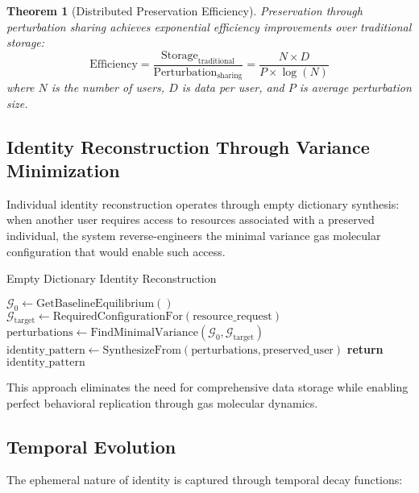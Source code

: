 \documentclass[12pt,a4paper]{article}
\newtheorem{theorem}{Theorem}
\begin{document}
\begin{theorem}[Distributed Preservation Efficiency]
Preservation through perturbation sharing achieves exponential efficiency improvements over traditional storage:
\begin{equation}
\text{Efficiency} = \frac{\text{Storage}_{\text{traditional}}}{\text{Perturbation}_{\text{sharing}}} = \frac{N \times D}{P \times \log(N)}
\end{equation}
where $N$ is the number of users, $D$ is data per user, and $P$ is average perturbation size.
\end{theorem}

\subsection{Identity Reconstruction Through Variance Minimization}

Individual identity reconstruction operates through empty dictionary synthesis: when another user requires access to resources associated with a preserved individual, the system reverse-engineers the minimal variance gas molecular configuration that would enable such access.

\begin{algorithm}
\caption{Empty Dictionary Identity Reconstruction}
\begin{algorithmic}[1]
    \State $\mathcal{G}_0 \leftarrow \text{GetBaselineEquilibrium}()$
    \State $\mathcal{G}_{\text{target}} \leftarrow \text{RequiredConfigurationFor}(\text{resource\_request})$
    \State $\text{perturbations} \leftarrow \text{FindMinimalVariance}(\mathcal{G}_0, \mathcal{G}_{\text{target}})$
    \State $\text{identity\_pattern} \leftarrow \text{SynthesizeFrom}(\text{perturbations}, \text{preserved\_user})$
    \State \textbf{return} $\text{identity\_pattern}$
\EndProcedure
\end{algorithmic}
\end{algorithm}

This approach eliminates the need for comprehensive data storage while enabling perfect behavioral replication through gas molecular dynamics.

\subsection{Temporal Evolution}

The ephemeral nature of identity is captured through temporal decay functions:
\end{document}
